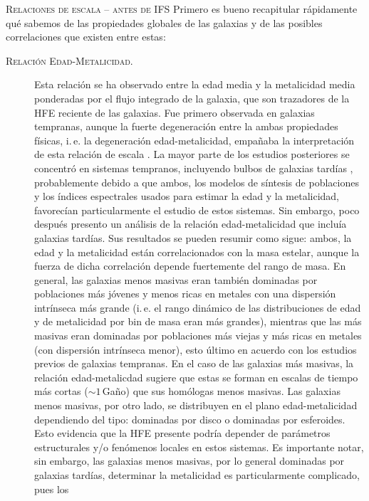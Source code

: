 \documentclass[xcolor=dvipsnames,4pt]{beamer}
\begin{document}
\begin{frame}[allowframebreaks]{\textsc{Relaciones de escala -- antes de IFS}}
%
Primero es bueno recapitular rápidamente qué sabemos de las propiedades globales de las galaxias y
de las posibles correlaciones que existen entre estas:
%
\begin{description}
%
\item[\textsc{Relación Edad-Metalicidad.}] Esta relación se ha observado entre la edad media y la
metalicidad media ponderadas por el flujo integrado de la galaxia, que son trazadores de la HFE
reciente de las galaxias. Fue primero observada en galaxias tempranas, aunque la fuerte degeneración
entre la ambas propiedades físicas, i.\,e. la degeneración edad-metalicidad, empañaba la
interpretación de esta relación de escala \citep{Worthey1994}. La mayor parte de los estudios
posteriores se concentró en sistemas tempranos, incluyendo bulbos de galaxias tardías
\citep{Proctor2002, Terlevich2002}, probablemente debido a que ambos, los modelos de síntesis de
poblaciones y los índices espectrales usados para estimar la edad y la metalicidad, favorecían
particularmente el estudio de estos sistemas. Sin embargo, poco después \citet{Gallazzi2005}
presento un análisis de la relación edad-metalicidad que incluía galaxias tardías. Sus resultados se
pueden resumir como sigue: ambos, la edad y la metalicidad están correlacionados con la masa
estelar, aunque la fuerza de dicha correlación depende fuertemente del rango de masa. En general,
las galaxias menos masivas eran también dominadas por poblaciones más jóvenes y menos ricas en
metales con una dispersión intrínseca más grande (i.\,e. el rango dinámico de las distribuciones de
edad y de metalicidad por bin de masa eran más grandes), mientras que las más masivas eran dominadas
por poblaciones más viejas y más ricas en metales (con dispersión intrínseca menor), esto último en
acuerdo con los estudios previos de galaxias tempranas. En el caso de las galaxias más masivas, la
relación edad-metalicdad sugiere que estas se forman en escalas de tiempo más cortas ($\sim1\,$Gaño)
que sus homólogas menos masivas. Las galaxias menos masivas, por otro lado, se distribuyen en el
plano edad-metalicidad dependiendo del tipo: dominadas por disco o dominadas por esferoides. Esto
evidencia que la HFE presente podría depender de parámetros estructurales y/o fenómenos locales en
estos sistemas. Es importante notar, sin embargo, las galaxias menos masivas, por lo general
dominadas por galaxias tardías, determinar la metalicidad es particularmente complicado, pues los

\end{description}
\end{frame}
\end{document}
